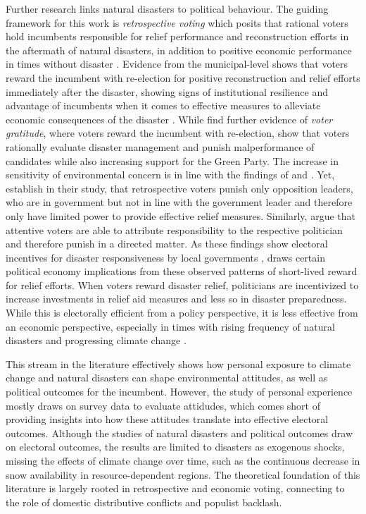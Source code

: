 \documentclass{article}
\begin{document}
Further research links natural disasters to political behaviour. The guiding framework  for this work is \textit{retrospective voting} which posits that rational voters hold incumbents responsible for relief performance and reconstruction efforts in the aftermath of natural disasters, in addition to positive economic performance in times without disaster \parencite{HEALY2009, Achen2016-zp}. Evidence from the municipal-level shows that voters reward the incumbent with re-election for positive reconstruction and relief efforts immediately after the disaster, showing signs of institutional resilience and advantage of incumbents when it comes to effective measures to alleviate economic consequences of the disaster  \parencite{Masiero2021, TaheriHosseinkhani2026}. While \textcite{bechtel2011} find further evidence of \textit{voter gratitude}, where voters reward the incumbent with re-election, \textcite{Pink2023} show that voters rationally evaluate disaster management and punish malperformance of candidates while also increasing support for the Green Party. The increase in sensitivity of environmental concern is in line with the findings of \textcite{baccini2021} and \textcite{Masiero2021}. Yet, \textcite{Blankenship2020} establish in their study, that retrospective voters punish only opposition leaders, who are in government but not in line with the government leader and therefore only have limited power to provide effective relief measures. Similarly, \textcite{Gasper2011}  argue that attentive voters are able to attribute responsibility to the respective politician and therefore punish in a directed matter. As these findings show electoral incentives for disaster responsiveness by local governments \parencite{Livert2025}, \textcite{HEALY2009} draws certain political economy implications from these observed patterns of short-lived reward for relief efforts. When voters reward disaster relief, politicians are incentivized to increase investments in relief aid measures and less so in disaster preparedness. While this is electorally efficient from a policy perspective, it is less effective from an economic perspective, especially in times with rising frequency of natural disasters and progressing climate change \parencite{Seneviratne2023}. 

This stream in the literature effectively shows how personal exposure to climate change and natural disasters can shape environmental attitudes, as well as political outcomes for the incumbent. However, the study of personal experience mostly draws on survey data to evaluate attidudes, which comes short of providing insights into how these attitudes translate into effective electoral outcomes. Although the studies of natural disasters and political outcomes draw on electoral outcomes, the results are limited to disasters as exogenous shocks, missing the effects of climate change over time, such as the continuous decrease in snow availability in resource-dependent regions. 
The theoretical foundation of this literature is largely rooted in retrospective and economic voting, connecting to the role of domestic distributive conflicts and populist backlash.  
\end{document}
